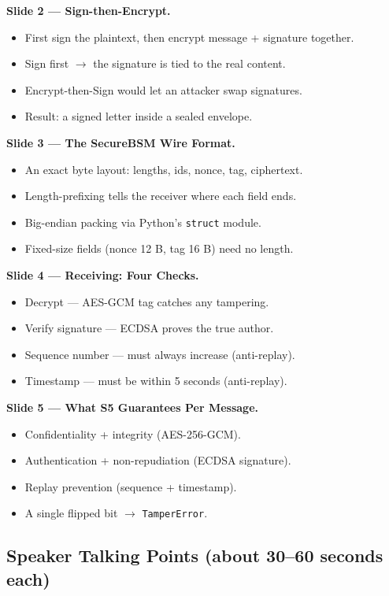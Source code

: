 \documentclass[11pt,a4paper]{article}
\begin{document}
\textbf{Slide 2 --- Sign-then-Encrypt.}
\begin{itemize}
  \item First sign the plaintext, then encrypt message + signature together.
  \item Sign first $\to$ the signature is tied to the real content.
  \item Encrypt-then-Sign would let an attacker swap signatures.
  \item Result: a signed letter inside a sealed envelope.
\end{itemize}

\textbf{Slide 3 --- The SecureBSM Wire Format.}
\begin{itemize}
  \item An exact byte layout: lengths, ids, nonce, tag, ciphertext.
  \item Length-prefixing tells the receiver where each field ends.
  \item Big-endian packing via Python's \texttt{struct} module.
  \item Fixed-size fields (nonce 12 B, tag 16 B) need no length.
\end{itemize}

\textbf{Slide 4 --- Receiving: Four Checks.}
\begin{itemize}
  \item Decrypt --- AES-GCM tag catches any tampering.
  \item Verify signature --- ECDSA proves the true author.
  \item Sequence number --- must always increase (anti-replay).
  \item Timestamp --- must be within 5 seconds (anti-replay).
\end{itemize}

\textbf{Slide 5 --- What S5 Guarantees Per Message.}
\begin{itemize}
  \item Confidentiality + integrity (AES-256-GCM).
  \item Authentication + non-repudiation (ECDSA signature).
  \item Replay prevention (sequence + timestamp).
  \item A single flipped bit $\to$ \texttt{TamperError}.
\end{itemize}

\subsection{Speaker Talking Points (about 30--60 seconds each)}
\end{document}
